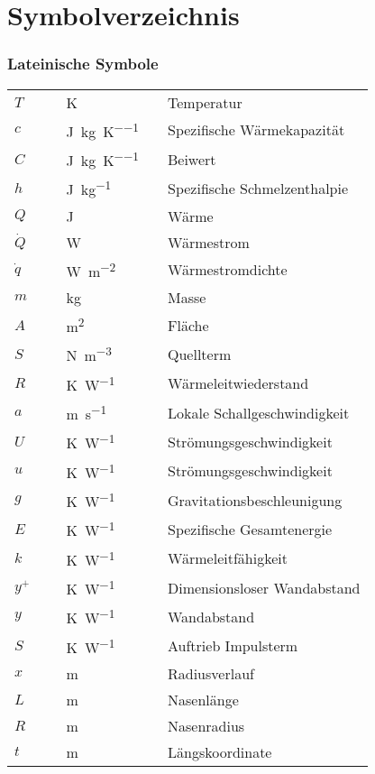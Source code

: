\chapter*{Symbolverzeichnis}
	
\subsection*{Lateinische Symbole}

\begin{supertabular}{p{10mm}p{3mm}p{20mm}p{3mm}l}
$T$ && \SI{}{\kelvin} && Temperatur\\
$c$ && \SI{}{\joule\per\kilogram\per\kelvin} && Spezifische Wärmekapazität\\
$C$ && \SI{}{\joule\per\kilogram\per\kelvin} && Beiwert\\
$h$ && \SI{}{\joule\per\kilogram} && Spezifische Schmelzenthalpie\\
$Q$ && \SI{}{\joule} && Wärme\\
$\dot{Q}$ && \SI{}{\watt} && Wärmestrom\\
$\dot{q}$ && \SI{}{\watt\per\meter\squared} && Wärmestromdichte\\ 
$m$ && \SI{}{\kilo\gram} && Masse\\
$A$ && \SI{}{\meter\squared} && Fläche\\
$S$ && \SI{}{\newton\per\meter\cubed} && Quellterm\\
$R$ && \SI{}{\kelvin\per\watt} && Wärmeleitwiederstand\\
$a$ && \SI{}{\meter\per\second} && Lokale Schallgeschwindigkeit\\
$U$ && \SI{}{\kelvin\per\watt} && Strömungsgeschwindigkeit\\
$u$ && \SI{}{\kelvin\per\watt} && Strömungsgeschwindigkeit\\
$g$ && \SI{}{\kelvin\per\watt} && Gravitationsbeschleunigung\\
$E$ && \SI{}{\kelvin\per\watt} && Spezifische Gesamtenergie\\
$k$ && \SI{}{\kelvin\per\watt} && Wärmeleitfähigkeit\\
$y^+$ && \SI{}{\kelvin\per\watt} && Dimensionsloser Wandabstand\\
$y$ && \SI{}{\kelvin\per\watt} && Wandabstand\\
$S$ && \SI{}{\kelvin\per\watt} && Auftrieb Impulsterm\\
$x$ && \SI{}{\meter} && Radiusverlauf\\
$L$ && \SI{}{\meter} && Nasenlänge\\
$R$ && \SI{}{\meter} && Nasenradius\\
$t$ && \SI{}{\meter} && Längskoordinate\\
\end{supertabular}



